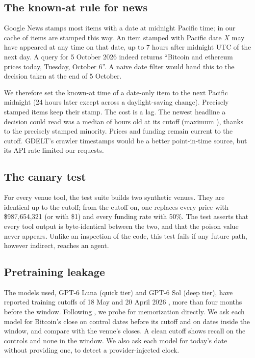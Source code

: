 \documentclass[11pt]{article}
\theoremstyle{remark}
\begin{document}
\subsection{The known-at rule for news}\label{sec:news}
Google News stamps most items with a date at midnight Pacific time; in our cache \NewsDateOnly{} of \NewsItems{} items are stamped this way. An item stamped with Pacific date $X$ may have appeared at any time on that date, up to 7 hours after midnight UTC of the next day. A query for 5 October 2026 indeed returns ``Bitcoin and ethereum prices today, Tuesday, October 6''. A naive date filter would hand this to the decision taken at the end of 5 October.

We therefore set the known-at time of a date-only item to the next Pacific midnight (24 hours later except across a daylight-saving change). Precisely stamped items keep their stamp. The cost is a lag. The newest headline a decision could read was a median of \NewsAgeMed{} hours old at its cutoff (maximum \NewsAgeMax{}), thanks to the precisely stamped minority. Prices and funding remain current to the cutoff. GDELT's crawler timestamps \citep{leetaru2013gdelt} would be a better point-in-time source, but its API rate-limited our requests.

\subsection{The canary test}\label{sec:canary}
For every venue tool, the test suite builds two synthetic venues. They are identical up to the cutoff; from the cutoff on, one replaces every price with \$987{,}654{,}321 (or with \$1) and every funding rate with 50\%. The test asserts that every tool output is byte-identical between the two, and that the poison value never appears. Unlike an inspection of the code, this test fails if any future path, however indirect, reaches an agent.

\subsection{Pretraining leakage}
The models used, GPT-6 Luna (quick tier) and GPT-6 Sol (deep tier), have reported training cutoffs of 18 May and 20 April 2026 \citep{gpt6cutoffs}, more than four months before the window. Following \citet{lopezlira2025memorization}, we probe for memorization directly. We ask each model for Bitcoin's close on control dates before its cutoff and on dates inside the window, and compare with the venue's closes. A clean cutoff shows recall on the controls and none in the window. We also ask each model for today's date without providing one, to detect a provider-injected clock.
\end{document}
